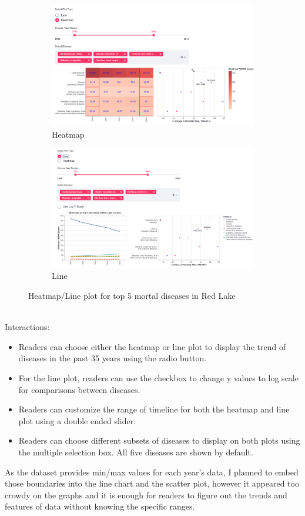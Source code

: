 \documentclass{article}
\begin{document}
\begin{figure}[htbp]
    \begin{subfigure}{.5\textwidth}
        \centering
        \includegraphics[width=\linewidth]{v4_1.png}
        \caption{Heatmap}
    \end{subfigure}
    \begin{subfigure}{.5\textwidth}
        \centering
        \includegraphics[width=\linewidth]{v4_2.png}
        \caption{Line}
    \end{subfigure}
    \caption{Heatmap/Line plot for top 5 mortal diseases in Red Lake}
\end{figure} \\
Interactions:
\begin{itemize}
    \item Readers can choose either the heatmap or line plot to display the trend of diseases in the past 35 years using the radio button.
    \item For the line plot, readers can use the checkbox to change y values to log scale for comparisons between diseases.
    \item Readers can customize the range of timeline for both the heatmap and line plot using a double ended slider.
    \item Readers can choose different subsets of diseases to display on both plots using the multiple selection box. All five diseases are shown by default.
\end{itemize}
\noindent
As the dataset provides min/max values for each year's data, I planned to embed those boundaries into the line chart and the scatter plot, however it appeared too crowdy on the graphs and it is enough for readers to figure out the trends and features of data without knowing the specific ranges.
\end{document}
